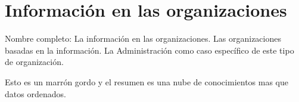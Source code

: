\setcounter{section}{28}
\section{Información en las organizaciones}

Nombre completo: La información en las organizaciones. Las organizaciones basadas en la información. La Administración como caso específico de este tipo de organización.

\localtableofcontents

Esto es un marrón gordo y el resumen es una nube de conocimientos mas que datos ordenados.